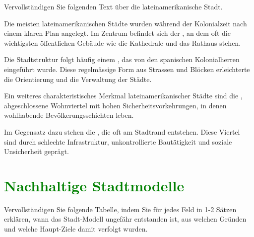 \begin{questions}
	\droptotalpoints
	
	\question[4] Vervollständigen Sie folgenden Text über die lateinamerikanische Stadt.
	
	Die meisten lateinamerikanischen Städte wurden während der Kolonialzeit nach einem klaren Plan angelegt. Im Zentrum befindet sich der , an dem oft die wichtigsten öffentlichen Gebäude wie die Kathedrale und das Rathaus stehen.
	
	Die Stadtstruktur folgt häufig einem \fillin[Schachbrettmuster][5cm], das von den spanischen Kolonialherren eingeführt wurde. Diese regelmässige Form aus Strassen und Blöcken erleichterte die Orientierung und die Verwaltung der Städte.
	
	Ein weiteres charakteristisches Merkmal lateinamerikanischer Städte sind die , abgeschlossene Wohnviertel mit hohen Sicherheitsvorkehrungen, in denen wohlhabende Bevölkerungsschichten leben.
	
	Im Gegensatz dazu stehen die , die oft am Stadtrand entstehen. Diese Viertel sind durch schlechte Infrastruktur, unkontrollierte Bautätigkeit und soziale Unsicherheit geprägt.
	
	\droptotalpoints
	
	\clearpage
	\section*{\textcolor{Green}{Nachhaltige Stadtmodelle}}
	\question[9] Vervollständigen Sie folgende Tabelle, indem Sie für jedes Feld in 1-2 Sätzen erklären, wann das Stadt-Modell ungefähr entstanden ist, aus welchen Gründen und welche Haupt-Ziele damit verfolgt wurden.
	

\end{questions}
